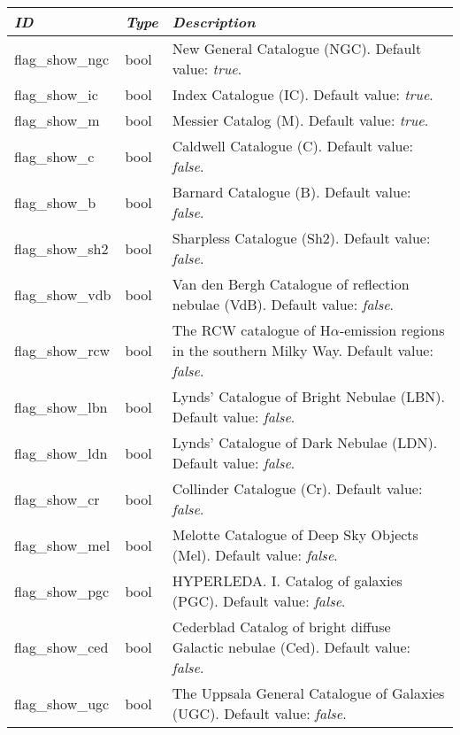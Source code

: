 \begin{longtabu} to \textwidth {l|l|X}
\toprule
\emph{ID} & \emph{Type} & \emph{Description}\\
\midrule
flag\_show\_ngc & bool & New General Catalogue (NGC). Default value: \emph{true}. \\
\midrule
flag\_show\_ic  & bool & Index Catalogue (IC). Default value: \emph{true}. \\
\midrule
flag\_show\_m   & bool & Messier Catalog (M). Default value: \emph{true}. \\
\midrule
flag\_show\_c   & bool & Caldwell Catalogue (C). Default value: \emph{false}. \\
\midrule
flag\_show\_b   & bool & Barnard Catalogue (B). Default value: \emph{false}. \\
\midrule
flag\_show\_sh2 & bool & Sharpless Catalogue (Sh2). Default value: \emph{false}. \\
\midrule
flag\_show\_vdb & bool & Van den Bergh Catalogue of reflection nebulae (VdB). Default value: \emph{false}. \\
\midrule
flag\_show\_rcw & bool & The RCW catalogue of H$\alpha$-emission regions in the southern Milky Way. Default value: \emph{false}. \\
\midrule
flag\_show\_lbn & bool & Lynds' Catalogue of Bright Nebulae (LBN). Default value: \emph{false}. \\
\midrule
flag\_show\_ldn & bool & Lynds' Catalogue of Dark Nebulae (LDN). Default value: \emph{false}. \\
\midrule
flag\_show\_cr  & bool & Collinder Catalogue (Cr). Default value: \emph{false}. \\
\midrule
flag\_show\_mel & bool & Melotte Catalogue of Deep Sky Objects (Mel). Default value: \emph{false}. \\
\midrule
flag\_show\_pgc & bool & HYPERLEDA. I. Catalog of galaxies (PGC). Default value: \emph{false}. \\
\midrule
flag\_show\_ced & bool & Cederblad Catalog of bright diffuse Galactic nebulae (Ced). Default value: \emph{false}. \\
\midrule
flag\_show\_ugc & bool & The Uppsala General Catalogue of Galaxies (UGC). Default value: \emph{false}. \\
\bottomrule
\end{longtabu}

\section{}
\label{section-dsoux5ftypeux5ffilters}


